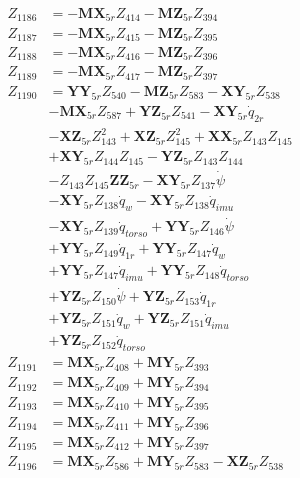 \begin{multicols}{2}
\begin{align}
Z_{1186} &= - \mathbf{MX}_{5r}Z_{414} - \mathbf{MZ}_{5r}Z_{394} \nonumber \\
Z_{1187} &= - \mathbf{MX}_{5r}Z_{415} - \mathbf{MZ}_{5r}Z_{395} \nonumber \\
Z_{1188} &= - \mathbf{MX}_{5r}Z_{416} - \mathbf{MZ}_{5r}Z_{396} \nonumber \\
Z_{1189} &= - \mathbf{MX}_{5r}Z_{417} - \mathbf{MZ}_{5r}Z_{397} \nonumber \\
Z_{1190} &= \mathbf{YY}_{5r}Z_{540} - \mathbf{MZ}_{5r}Z_{583} - \mathbf{XY}_{5r}Z_{538}  \nonumber \\
&- \mathbf{MX}_{5r}Z_{587} + \mathbf{YZ}_{5r}Z_{541} - \mathbf{XY}_{5r}\dot{q}_{2r}  \nonumber \\
&- \mathbf{XZ}_{5r}Z_{143}^2 + \mathbf{XZ}_{5r}Z_{145}^2 + \mathbf{XX}_{5r}Z_{143}Z_{145}  \nonumber \\
&+ \mathbf{XY}_{5r}Z_{144}Z_{145} - \mathbf{YZ}_{5r}Z_{143}Z_{144}  \nonumber \\
&- Z_{143}Z_{145}\mathbf{ZZ}_{5r} - \mathbf{XY}_{5r}Z_{137}\dot{\psi}  \nonumber \\
&- \mathbf{XY}_{5r}Z_{138}\dot{q}_{w} - \mathbf{XY}_{5r}Z_{138}\dot{q}_{imu}  \nonumber \\
&- \mathbf{XY}_{5r}Z_{139}\dot{q}_{torso} + \mathbf{YY}_{5r}Z_{146}\dot{\psi}  \nonumber \\
&+ \mathbf{YY}_{5r}Z_{149}\dot{q}_{1r} + \mathbf{YY}_{5r}Z_{147}\dot{q}_{w}  \nonumber \\
&+ \mathbf{YY}_{5r}Z_{147}\dot{q}_{imu} + \mathbf{YY}_{5r}Z_{148}\dot{q}_{torso}  \nonumber \\
&+ \mathbf{YZ}_{5r}Z_{150}\dot{\psi} + \mathbf{YZ}_{5r}Z_{153}\dot{q}_{1r}  \nonumber \\
&+ \mathbf{YZ}_{5r}Z_{151}\dot{q}_{w} + \mathbf{YZ}_{5r}Z_{151}\dot{q}_{imu}  \nonumber \\
&+ \mathbf{YZ}_{5r}Z_{152}\dot{q}_{torso} \nonumber \\
Z_{1191} &= \mathbf{MX}_{5r}Z_{408} + \mathbf{MY}_{5r}Z_{393} \nonumber \\
Z_{1192} &= \mathbf{MX}_{5r}Z_{409} + \mathbf{MY}_{5r}Z_{394} \nonumber \\
Z_{1193} &= \mathbf{MX}_{5r}Z_{410} + \mathbf{MY}_{5r}Z_{395} \nonumber \\
Z_{1194} &= \mathbf{MX}_{5r}Z_{411} + \mathbf{MY}_{5r}Z_{396} \nonumber \\
Z_{1195} &= \mathbf{MX}_{5r}Z_{412} + \mathbf{MY}_{5r}Z_{397} \nonumber \\
Z_{1196} &= \mathbf{MX}_{5r}Z_{586} + \mathbf{MY}_{5r}Z_{583} - \mathbf{XZ}_{5r}Z_{538}  \nonumber \\

\end{align}
\end{multicols}
